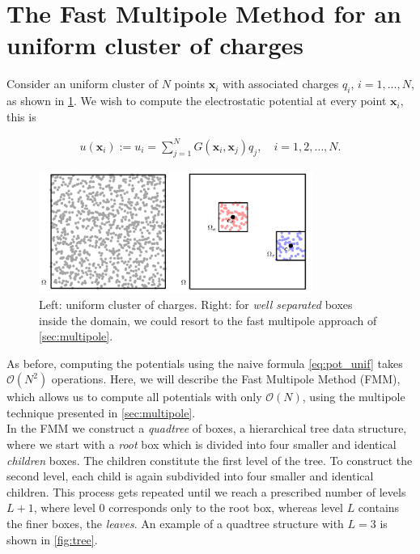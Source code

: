 \documentclass[final,onefignum,onetabnum]{siamart220329}
\newcommand{\bol}{\boldsymbol}
\newcommand{\Ocal}{\mathcal{O}}
\newcounter{example}
\begin{document}
\section{The Fast Multipole Method for an uniform cluster of charges}\label{sec:fmm}

Consider an uniform cluster of $N$ points $\bol x_i$ with associated charges $q_i$, $i=1,\dots,N$, as shown in \cref{fig:unif_points}. We wish to compute the electrostatic potential at every point $\bol x_i$, this is

\begin{align}
	u(\bol x_i) := u_i = \sum_{j=1}^{N} G(\bol x_i, \bol x_j)q_j, \quad i = 1,2,\dots,N. \label{eq:pot_unif}
\end{align}

\begin{figure}[h!]
	\centering
	\includegraphics[width=0.8\textwidth]{unif_points}
	\caption{Left: uniform cluster of charges. Right: for \textit{well separated} boxes inside the domain, we could resort to the fast multipole approach of \cref{sec:multipole}.}
\label{fig:unif_points}
\end{figure}

As before, computing the potentials using the naive formula \cref{eq:pot_unif} takes $\Ocal(N^2)$ operations. Here, we will describe the Fast Multipole Method (FMM), which allows us to compute all potentials with only $\Ocal(N)$, using the multipole technique presented in \cref{sec:multipole}.\\
In the FMM we construct a \textit{quadtree} of boxes, a hierarchical tree data structure, where we start with a \textit{root} box which is divided into four smaller and identical \textit{children} boxes. The children constitute the first level of the tree. To construct the second level, each child is again subdivided into four smaller and identical children. This process gets repeated until we reach a prescribed number of levels $L+1$, where level 0 corresponds only to the root box, whereas level $L$ contains the finer boxes, the \textit{leaves}. An example of a quadtree structure with $L=3$ is shown in \cref{fig:tree}.
\end{document}
